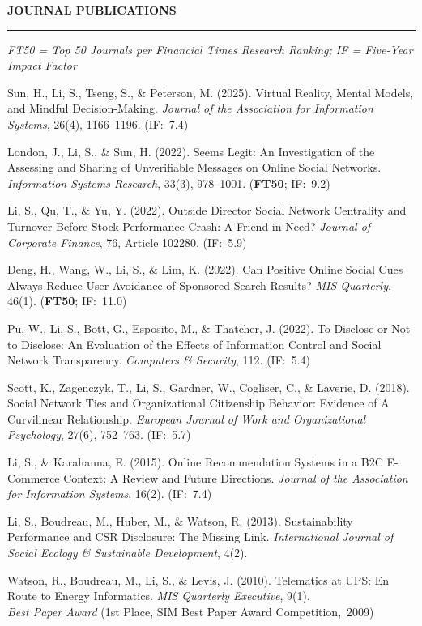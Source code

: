 \documentclass[11pt, letterpaper]{article}
\newcommand{\cvsection}[1]{%
  \vspace{14pt}%
  {\large\bfseries\color{headcolor}\MakeUppercase{#1}}%
  \vspace{2pt}\hrule\vspace{6pt}%
}
\begin{document}
\cvsection{Journal Publications}

{\small\textit{FT50 = Top 50 Journals per Financial Times Research Ranking; IF = Five-Year Impact Factor}}

\vspace{4pt}
\begin{publist}
  \item Sun, H., Li, S., Tseng, S., \& Peterson, M. (2025). Virtual Reality, Mental Models, and Mindful Decision-Making. \textit{Journal of the Association for Information Systems}, 26(4), 1166--1196. (IF:~7.4)

  \item London, J., Li, S., \& Sun, H. (2022). Seems Legit: An Investigation of the Assessing and Sharing of Unverifiable Messages on Online Social Networks. \textit{Information Systems Research}, 33(3), 978--1001. (\textbf{FT50}; IF:~9.2)

  \item Li, S., Qu, T., \& Yu, Y. (2022). Outside Director Social Network Centrality and Turnover Before Stock Performance Crash: A Friend in Need? \textit{Journal of Corporate Finance}, 76, Article 102280. (IF:~5.9)

  \item Deng, H., Wang, W., Li, S., \& Lim, K. (2022). Can Positive Online Social Cues Always Reduce User Avoidance of Sponsored Search Results? \textit{MIS Quarterly}, 46(1). (\textbf{FT50}; IF:~11.0)

  \item Pu, W., Li, S., Bott, G., Esposito, M., \& Thatcher, J. (2022). To Disclose or Not to Disclose: An Evaluation of the Effects of Information Control and Social Network Transparency. \textit{Computers \& Security}, 112. (IF:~5.4)

  \item Scott, K., Zagenczyk, T., Li, S., Gardner, W., Cogliser, C., \& Laverie, D. (2018). Social Network Ties and Organizational Citizenship Behavior: Evidence of A Curvilinear Relationship. \textit{European Journal of Work and Organizational Psychology}, 27(6), 752--763. (IF:~5.7)

  \item Li, S., \& Karahanna, E. (2015). Online Recommendation Systems in a B2C E-Commerce Context: A Review and Future Directions. \textit{Journal of the Association for Information Systems}, 16(2). (IF:~7.4)

  \item Li, S., Boudreau, M., Huber, M., \& Watson, R. (2013). Sustainability Performance and CSR Disclosure: The Missing Link. \textit{International Journal of Social Ecology \& Sustainable Development}, 4(2).

  \item Watson, R., Boudreau, M., Li, S., \& Levis, J. (2010). Telematics at UPS: En Route to Energy Informatics. \textit{MIS Quarterly Executive}, 9(1).
  {\small\\\hspace{1.5em}\textit{Best Paper Award} (1st Place, SIM Best Paper Award Competition,~2009)}
\end{publist}
\end{document}
